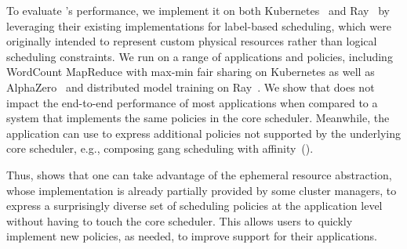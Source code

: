 To evaluate \name{}'s performance, we implement it on both Kubernetes~\cite{kubernetes} and Ray~\cite{ray} by leveraging their existing implementations 
for label-based scheduling, which were originally intended to represent custom physical resources rather than logical scheduling constraints.
We run \name{} on a range of applications and policies, including  WordCount MapReduce with max-min fair sharing on Kubernetes as well as
AlphaZero~\cite{silver2016alphago} and distributed model training on Ray~\cite{ray}. We show that \name{} does not impact the end-to-end performance of most applications when compared to a system that implements the same policies in the core scheduler. Meanwhile, the application can use \name{} to express additional policies not supported by the underlying core scheduler, e.g., composing gang scheduling with affinity~(). %

Thus, \name{} shows that one can take advantage of the ephemeral resource abstraction, whose implementation is already partially provided by some cluster managers, to express a surprisingly diverse set of scheduling policies at the application level without having to touch the core scheduler. This allows users to quickly implement new policies, as needed, to improve support for their applications.


